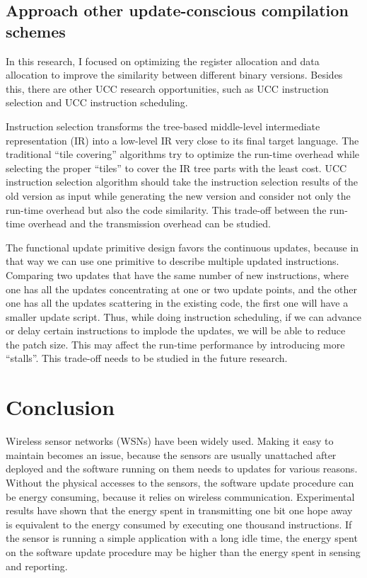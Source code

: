 \subsection{Approach other update-conscious compilation schemes}
In this research, I focused on optimizing the register allocation and data allocation to improve the similarity between different binary versions. Besides this, there are other UCC research opportunities, such as UCC instruction selection and UCC instruction scheduling.

Instruction selection transforms the tree-based middle-level intermediate representation (IR) into a low-level IR very close to its final target language. The traditional ``tile covering'' algorithms try to optimize the run-time overhead while selecting the proper ``tiles'' to cover the IR tree parts with the least cost. UCC instruction selection algorithm should take the instruction selection results of the old version as input while generating the new version and consider not only the run-time overhead but also the code similarity. This trade-off between the run-time overhead and the transmission overhead can be studied.

The functional update primitive design favors the continuous updates, because in that way we can use one primitive to describe multiple updated instructions. 
Comparing two updates that have the same number of new instructions, where one has all the updates concentrating at one or two update points, and the other one has all the updates scattering in the existing code, the first one will have a smaller update script. 
Thus, while doing instruction scheduling, if we can advance or delay certain instructions to implode the updates, we will be able to reduce the patch size.
This may affect the run-time performance by introducing more ``stalls''. This trade-off needs to be studied in the future research.

\section{Conclusion}
Wireless sensor networks (WSNs) have been widely used. Making it easy to maintain becomes an issue, because the sensors are usually unattached after deployed and the software running on them needs to updates for various reasons.
Without the physical accesses to the sensors, the software update procedure can be energy consuming, because it relies on wireless communication. Experimental results have shown that the energy spent in transmitting one bit one hope away is equivalent to the energy consumed by executing one thousand instructions. If the sensor is running a simple application with a long idle time, the energy spent on the software update procedure may be higher than the energy spent in sensing and reporting.


